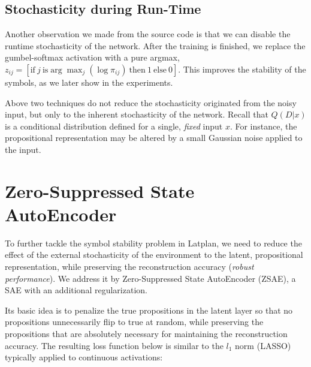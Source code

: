 \subsection{Stochasticity during Run-Time}

Another observation we made from the source code is that we can
disable the runtime stochasticity of the network.
After the training is finished, we replace the gumbel-softmax activation with
a pure argmax,
$z_{ij} = [ \text{if}\ j\ \text{is} \arg \max_j (\log \pi_{ij})\ \text{then}\ 1\ \text{else}\ 0 ]$.
This improves the stability of the symbols, as we later show in the experiments.

Above two techniques do not reduce the stochasticity originated from the noisy input,
but only to the inherent stochasticity of the network.
Recall that $Q(D|x)$ is a conditional distribution defined for a single, \emph{fixed} input $x$.
% 
For instance, the propositional representation may be altered by a small
Gaussian noise applied to the input.

\section{Zero-Suppressed State AutoEncoder}
\label{zsae}


To further tackle the symbol stability problem in Latplan,
we need to reduce the effect of the external stochasticity of the environment
to the latent, propositional representation, while preserving the reconstruction accuracy
 (\emph{robust performance}).
We address it by Zero-Suppressed State AutoEncoder (ZSAE),
a SAE with an additional regularization.

Its basic idea is to penalize the
true propositions in the latent layer so that no propositions unnecessarily flip to true at random,
while preserving the propositions that are absolutely necessary for maintaining the reconstruction accuracy.
% 
The resulting loss function below is similar to the $l_1$ norm (LASSO) typically
applied to continuous activations:

